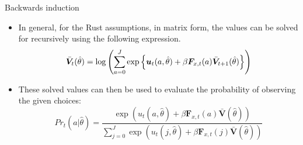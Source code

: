 \documentclass[aspectratio=169]{beamer}
\begin{document}
	\begin{frame}{Backwards induction}
		\begin{itemize}
			\itemsep1em
			\item In general, for the Rust assumptions, in matrix form, the values can be solved for recursively using the following expression.
			\begin{equation}
				\Bar{\bm{V}}_t(\hat{\theta}) = \log \left( \sum_{a=0}^J \exp \left\{ \bm{u}_t(a,\hat{\theta}) + \beta \bm{F}_{x,t}(a) \bar{\bm{V}}_{t+1}(\hat{\theta}) \right\} \right)
			\end{equation}
			\item These solved values can then be used to evaluate the probability of observing the given choices:
			\begin{equation}
				Pr_t(a | \hat{\theta}) = \frac{\exp(u_t(a,\hat{\theta}) + \beta \bm{F}_{x,t}(a) \bar{\bm{V}}(\hat{\theta}))}{\sum_{j =0}^J \exp(u_t(j,\hat{\theta}) + \beta \bm{F}_{x,t}(j) \bar{\bm{V}}(\hat{\theta}))}
			\end{equation}
		\end{itemize}
	\end{frame}
	
\end{document}

